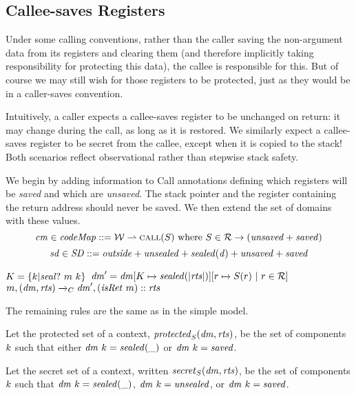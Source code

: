 \documentclass[acmsmall,review,anonymous]{acmart}\settopmatter{printfolios=true,printccs=false,printacmref=false}
\begin{document}
{\subsection{Callee-saves Registers}
\label{sec:callee}

Under some calling conventions, rather than the caller saving the non-argument
data from its registers
and clearing them (and therefore implicitly taking responsibility for
protecting this data),
the callee is responsible for this. But of course we may still wish for
those registers to be
protected, just as they would be in a caller-saves convention.

Intuitively, a caller expects a callee-saves register to be unchanged on
return: it
may change during the call, as long as it is restored. We similarly expect a callee-saves
register to be secret from the callee, except when it is copied to the stack! Both scenarios
reflect observational rather than stepwise stack safety.

We begin by adding information to Call annotations defining which registers will be {\em saved}
and which are {\em unsaved}. The stack pointer and the register containing the return address
should never be saved. We then extend the set of domains with these values.
%
\[\mathit{cm} \in \mathit{codeMap} ::= {\mathcal W} \rightharpoonup \text{\sc call}(S) ~ \mbox{\rm{where}} ~ S \in {\mathcal R} \rightarrow (\mathit{unsaved} + \mathit{saved})\]
%
\[\mathit{sd} \in \mathit{SD} ::= \mathit{outside} + \mathit{unsealed} + \mathit{sealed(d)} + \mathit{unsaved} + \mathit{saved}\]

              {\(K = \{k | \mathit{seal?} ~ m ~ k\}\)}
              {\(\mathit{dm}' = \mathit{dm}[K \mapsto \mathit{sealed(|\mathit{rts}|)}][r \mapsto S(r) ~ | ~ r \in {\mathcal R}]\)}
              {\(m,(\mathit{dm},\mathit{rts}) \xrightarrow{}_C \mathit{dm}',(\mathit{isRet} ~ m)::\mathit{rts}\)}

The remaining rules are the same as in the simple model.

 Let the protected set of a context, \(\mathit{protected}_S(\mathit{dm},\mathit{rts})\),
be the set of components \(k\) such that either \(\mathit{dm} ~ k = \mathit{sealed(\mbox{\_})}\)
or \(\mathit{dm} ~ k = \mathit{saved}\).

 Let the secret set of a context, written \(\mathit{secret}_S(\mathit{dm},\mathit{rts})\),
be the set of components \(k\) such that
\(\mathit{dm} ~ k = \mathit{sealed(\mbox{\_})}\), \(\mathit{dm} ~ k = \mathit{unsealed}\), or
\(\mathit{dm} ~ k = \mathit{saved}\).

}
\end{document}
